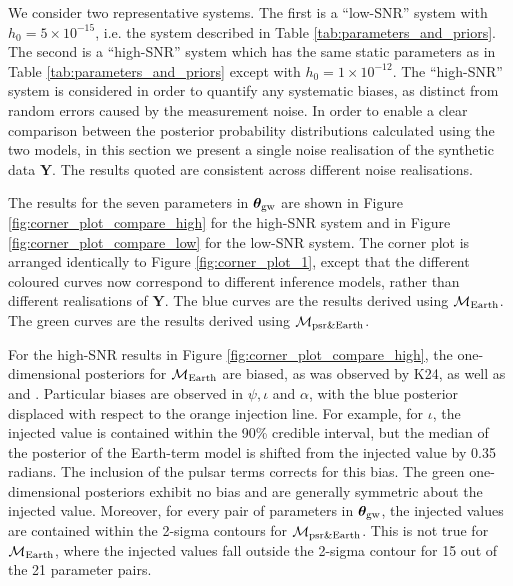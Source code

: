 \documentclass[fleqn,usenatbib,useAMS]{mnras}
\begin{document}
We consider two representative systems. The first is a ``low-SNR'' system with $h_0 = 5 \times 10^{-15}$, i.e. the system described in Table \ref{tab:parameters_and_priors}. The second is a ``high-SNR'' system which has the same static parameters as in Table \ref{tab:parameters_and_priors} except with $h_0 = 1 \times 10^{-12}$. The ``high-SNR'' system is considered in order to quantify any systematic biases, as distinct from random errors caused by the measurement noise. In order to enable a clear comparison between the posterior probability distributions calculated using the two models, in this section we present a single noise realisation of the synthetic data $\boldsymbol{Y}$. The results quoted are consistent across different noise realisations. \newline 


The results for the seven parameters in $\boldsymbol{\theta}_{\rm gw}$ are shown in Figure \ref{fig:corner_plot_compare_high} for the high-SNR system and in Figure \ref{fig:corner_plot_compare_low} for the low-SNR system. The corner plot is arranged identically to Figure \ref{fig:corner_plot_1}, except that the different coloured curves now correspond to different inference models, rather than different realisations of $\boldsymbol{Y}$. The blue curves are the results derived using $\mathcal{M}_{\rm Earth}$. The green curves are the results derived using $\mathcal{M}_{\rm psr \& Earth}$. \newline 
		
For the high-SNR results in Figure \ref{fig:corner_plot_compare_high}, the one-dimensional posteriors for $\mathcal{M}_{\rm Earth}$ are biased, as was observed by K24, as well as \cite{Zhupulsarterms} and \cite{Chen2022}. Particular biases are observed in $\psi, \iota $ and $\alpha$, with the blue posterior displaced with respect to the orange injection line. For example, for $\iota$, the injected value is contained within the 90\% credible interval, but the median of the posterior of the Earth-term model is shifted from the injected value by 0.35 radians. The inclusion of the pulsar terms corrects for this bias. The green one-dimensional posteriors exhibit no bias and are generally symmetric about the injected value. Moreover, for every pair of parameters in ${\boldsymbol{\theta}}_{\rm gw}$, the injected values are contained within the 2-sigma contours for $\mathcal{M}_{\rm psr \& Earth}$. This is not true for $\mathcal{M}_{\rm Earth}$, where the injected values fall outside the 2-sigma contour for 15 out of the 21 parameter pairs.\newline 
\end{document}
